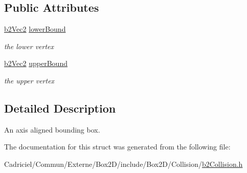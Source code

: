 \subsection*{Public Attributes}
\begin{DoxyCompactItemize}
\item 
\hyperlink{structb2_vec2}{b2\+Vec2} \hyperlink{structb2_a_a_b_b_ab94b68fbad8348b22b0522469b11bdb5}{lower\+Bound}\hypertarget{structb2_a_a_b_b_ab94b68fbad8348b22b0522469b11bdb5}{}\label{structb2_a_a_b_b_ab94b68fbad8348b22b0522469b11bdb5}

\begin{DoxyCompactList}\small\item\em the lower vertex \end{DoxyCompactList}\item 
\hyperlink{structb2_vec2}{b2\+Vec2} \hyperlink{structb2_a_a_b_b_ad4a8ec483ba13a2c02918b01d058a18f}{upper\+Bound}\hypertarget{structb2_a_a_b_b_ad4a8ec483ba13a2c02918b01d058a18f}{}\label{structb2_a_a_b_b_ad4a8ec483ba13a2c02918b01d058a18f}

\begin{DoxyCompactList}\small\item\em the upper vertex \end{DoxyCompactList}\end{DoxyCompactItemize}


\subsection{Detailed Description}
An axis aligned bounding box. 

The documentation for this struct was generated from the following file\+:\begin{DoxyCompactItemize}
\item 
Cadriciel/\+Commun/\+Externe/\+Box2\+D/include/\+Box2\+D/\+Collision/\hyperlink{b2_collision_8h}{b2\+Collision.\+h}\end{DoxyCompactItemize}
